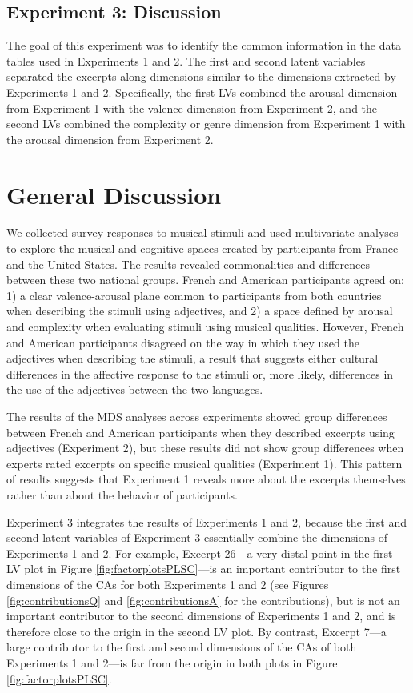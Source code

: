 \documentclass[
  english,
  man]{apa6}
\begin{document}
\hypertarget{experiment-3-discussion}{%
\subsection{Experiment 3: Discussion}\label{experiment-3-discussion}}

The goal of this experiment was to identify the common information in the data tables used in Experiments 1 and 2. The first and second latent variables separated the excerpts along dimensions similar to the dimensions extracted by Experiments 1 and 2. Specifically, the first LVs combined the arousal dimension from Experiment 1 with the valence dimension from Experiment 2, and the second LVs combined the complexity or genre dimension from Experiment 1 with the arousal dimension from Experiment 2.

\hypertarget{general-discussion}{%
\section{General Discussion}\label{general-discussion}}

We collected survey responses to musical stimuli and used multivariate analyses to explore the musical and cognitive spaces created by participants from France and the United States. The results revealed commonalities and differences between these two national groups. French and American participants agreed on: 1) a clear valence-arousal plane common to participants from both countries when describing the stimuli using adjectives, and 2) a space defined by arousal and complexity when evaluating stimuli using musical qualities. However, French and American participants disagreed on the way in which they used the adjectives when describing the stimuli, a result that suggests either cultural differences in the affective response to the stimuli or, more likely, differences in the use of the adjectives between the two languages.

The results of the MDS analyses across experiments showed group differences between French and American participants when they described excerpts using adjectives (Experiment 2), but these results did not show group differences when experts rated excerpts on specific musical qualities (Experiment 1). This pattern of results suggests that Experiment 1 reveals more about the excerpts themselves rather than about the behavior of participants.

Experiment 3 integrates the results of Experiments 1 and 2, because the first and second latent variables of Experiment 3 essentially combine the dimensions of Experiments 1 and 2. For example, Excerpt 26---a very distal point in the first LV plot in Figure \ref{fig:factorplotsPLSC}---is an important contributor to the first dimensions of the CAs for both Experiments 1 and 2 (see Figures \ref{fig:contributionsQ} and \ref{fig:contributionsA} for the contributions), but is not an important contributor to the second dimensions of Experiments 1 and 2, and is therefore close to the origin in the second LV plot. By contrast, Excerpt 7---a large contributor to the first and second dimensions of the CAs of both Experiments 1 and 2---is far from the origin in both plots in Figure \ref{fig:factorplotsPLSC}.
\end{document}
